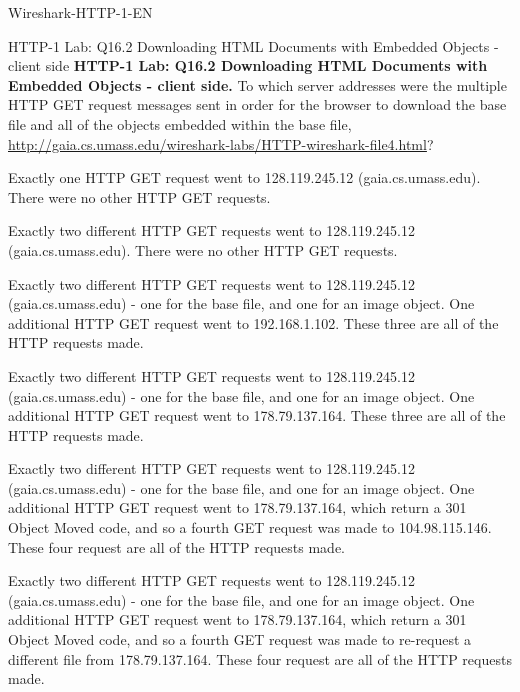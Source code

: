 \documentclass[a4paper]{article}
\begin{document}
\begin{quiz}{Wireshark-HTTP-1-EN}
\begin{multi}[points=1,shuffle]{HTTP-1 Lab: Q16.2 Downloading HTML Documents with Embedded Objects - client side}
\textbf{HTTP-1 Lab: Q16.2 Downloading HTML Documents with Embedded Objects - client side.} To which server addresses were the multiple HTTP GET request messages sent in order for the browser to download the base file and all of the objects embedded within the base file, \href{http://gaia.cs.umass.edu/wireshark-labs/HTTP-wireshark-file4.html}{http://gaia.cs.umass.edu/wireshark-labs/HTTP-wireshark-file4.html}?  
\item Exactly one HTTP GET request went to 128.119.245.12 (gaia.cs.umass.edu). There were no other HTTP GET requests.
\item Exactly two different HTTP GET requests went to 128.119.245.12 (gaia.cs.umass.edu). There were no other HTTP GET requests.
\item Exactly two different HTTP GET requests went to 128.119.245.12 (gaia.cs.umass.edu) - one for the base file, and one for an image object. One additional HTTP GET request went to 192.168.1.102. These three are all of the HTTP requests made.
\item Exactly two different HTTP GET requests went to 128.119.245.12 (gaia.cs.umass.edu) - one for the base file, and one for an image object. One additional HTTP GET request went to 178.79.137.164. These three are all of the HTTP requests made.
\item* Exactly two different HTTP GET requests went to 128.119.245.12 (gaia.cs.umass.edu) - one for the base file, and one for an image object.  One additional HTTP GET request went to 178.79.137.164, which return a 301 Object Moved code, and so a fourth GET request was made to 104.98.115.146. These four request are all of the HTTP requests made.
\item Exactly two different HTTP GET requests went to 128.119.245.12 (gaia.cs.umass.edu) - one for the base file, and one for an image object.  One additional HTTP GET request went to 178.79.137.164, which return a 301 Object Moved code, and so a fourth GET request was made to re-request a different file from 178.79.137.164. These four request are all of the HTTP requests made.
\end{multi}


\end{quiz}
\end{document}
